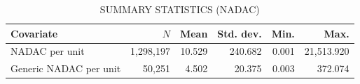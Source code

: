 \documentclass[12pt]{article}
\begin{document}
\begin{table}[!htbp]
\centering
\caption{\MakeUppercase{Summary Statistics (NADAC)}}
\label{summary:nadac}
\begin{singlespace}
\begin{minipage}{0.95\linewidth}
\small
\setlength{\tabcolsep}{4pt}
\begin{tabularx}{\linewidth}{@{}>{\raggedright\arraybackslash}Xrrrrr@{}}
\toprule
Covariate & $N$ & Mean & Std. dev. & Min. & Max. \\
\midrule
NADAC per unit & 1,298,197 & 10.529 & 240.682 & 0.001 & 21,513.920 \\
Generic NADAC per unit & 50,251 & 4.502 & 20.375 & 0.003 & 372.074 \\
\bottomrule
\end{tabularx}
\end{minipage}
\end{singlespace}
\end{table}
\end{document}

